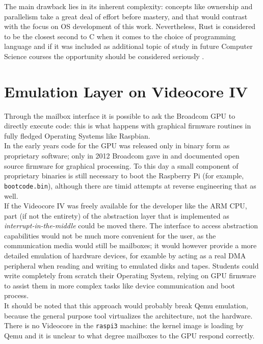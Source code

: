 \documentclass[12pt,a4paper,openright,twoside]{report}
\begin{document}
The main drawback lies in its inherent complexity: concepts like ownership and 
parallelism take a great deal of effort before mastery, and that would contrast
with the focus on OS development of this work. Nevertheless, Rust is considered
to be the closest second to C when it comes to the choice of programming language
and if it was included as additional topic of study in future Computer Science
courses the opportunity should be considered seriously .

\section{Emulation Layer on Videocore IV}
Through the mailbox interface it is possible to ask the Broadcom GPU to directly
execute code: this is what happens with graphical firmware routines in fully
fledged Operating Systems like Raspbian.\\
In the early years code for the GPU was released only in binary form as proprietary 
software; only in 2012 Broadcom gave in and documented open source firmware for 
graphical processing. To this day a small component of proprietary binaries is 
still necessary to boot the Raspberry Pi (for example, {\tt bootcode.bin}), although
there are timid attempts at reverse engineering that as well.\\

If the Videocore IV was freely available for the developer like the ARM CPU, part
(if not the entirety) of the abstraction layer that is implemented as 
\textit{interrupt-in-the-middle} could be moved there. The interface to access
abstraction capabilities would not be much more convenient for the user, 
as the communication media would still be mailboxes; it would however provide
a more detailed emulation of hardware devices, for examble by acting as a real
DMA peripheral when reading and writing to emulated disks and tapes.
Students could write completely from scratch their Operating System, relying on 
GPU firmware to assist them in more complex tasks like device communication and
boot process.\\
It should be noted that this approach would probably break Qemu emulation, 
because the general purpose tool virtualizes the architecture, not the hardware.
There is no Videocore in the {\tt raspi3} machine: the kernel image is loading 
by Qemu and it is unclear to what degree mailboxes to the GPU respond correctly.
\end{document}
